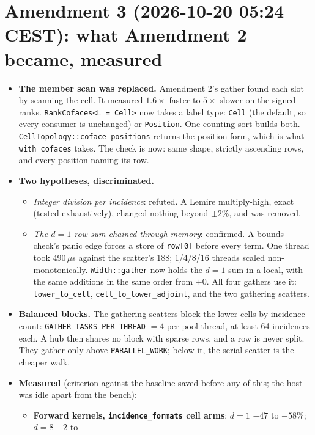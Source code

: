 \documentclass[11pt,a4paper]{article}
\begin{document}
\section{Amendment 3 (2026-10-20 05:24 CEST): what Amendment 2 became, measured}
\begin{itemize}
\item \textbf{The member scan was replaced.} Amendment 2's gather found each slot by scanning the cell. It measured
  $1.6\times$ faster to $5\times$ slower on the signed ranks. \texttt{RankCofaces<L = Cell>} now takes a label type:
  \texttt{Cell} (the default, so every consumer is unchanged) or \texttt{Position}. One counting sort builds both.
  \texttt{CellTopology::coface\_positions} returns the position form, which is what \texttt{with\_cofaces} takes.
  The check is now: same shape, strictly ascending rows, and every position naming its row.
\item \textbf{Two hypotheses, discriminated.}
  \begin{itemize}
  \item \emph{Integer division per incidence}: refuted. A Lemire multiply-high, exact (tested exhaustively), changed
    nothing beyond $\pm2\%$, and was removed.
  \item \emph{The $d=1$ row sum chained through memory}: confirmed. A bounds check's panic edge forces a store of
    \texttt{row[0]} before every term. One thread took 490\,$\mu$s against the scatter's 188; 1/4/8/16 threads
    scaled non-monotonically. \texttt{Width::gather} now holds the $d=1$ sum in a local, with the same additions in
    the same order from $+0$. All four gathers use it: \texttt{lower\_to\_cell}, \texttt{cell\_to\_lower\_adjoint},
    and the two gathering scatters.
  \end{itemize}
\item \textbf{Balanced blocks.} The gathering scatters block the lower cells by incidence count:
  \texttt{GATHER\_TASKS\_PER\_THREAD} $=4$ per pool thread, at least 64 incidences each. A hub then shares no
  block with sparse rows, and a row is never split. They gather only above \texttt{PARALLEL\_WORK}; below it, the
  serial scatter is the cheaper walk.
\item \textbf{Measured} (criterion against the baseline saved before any of this; the host was idle apart from the
  bench):
  \begin{itemize}
  \item \textbf{Forward kernels, \texttt{incidence\_formats} cell arms}: $d=1$ $-47$ to $-58\%$; $d=8$ $-2$ to

\end{itemize}
\end{itemize}
\end{document}
